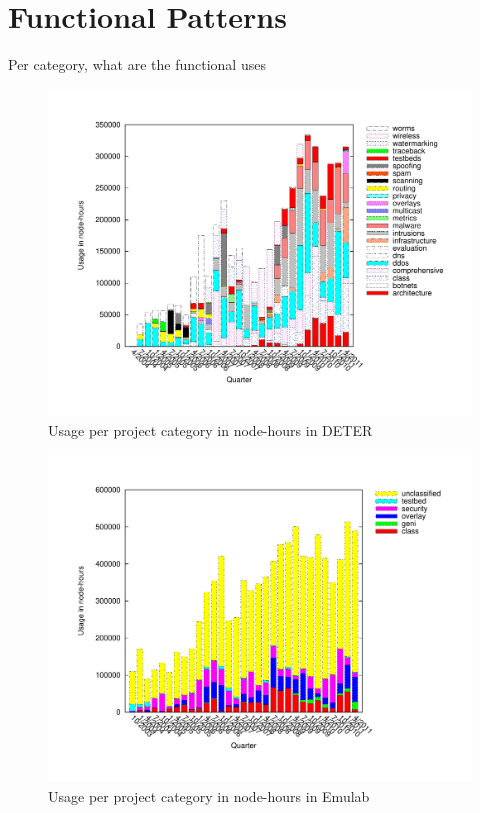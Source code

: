 \section{Functional Patterns}
\label{sec:function}

Per category, what are the functional uses 



\begin{figure}[htbp] \begin{center}
\includegraphics[width=6in,type=pdf,ext=.pdf,read=.pdf]{figs/cat.usage.gnu} \caption{Usage per project category in node-hours in DETER}
\label{catusage} \end{center} \end{figure}

\begin{figure}[htbp] \begin{center}
\includegraphics[width=6in,type=pdf,ext=.pdf,read=.pdf]{figs/cat.usage.emu.gnu} \caption{Usage per project category in node-hours in Emulab}
\label{catusage} \end{center} \end{figure}

